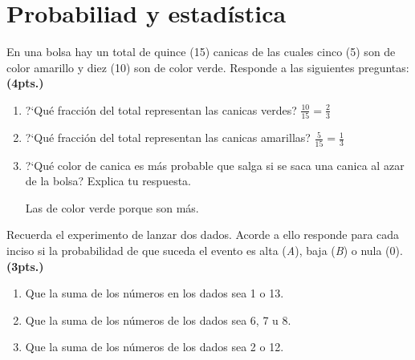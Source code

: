 \documentclass[11pt]{article}
\begin{document}
\vspace{5mm}

\begin{centering}


\end{centering}

\section{Probabiliad y estad\'istica}

En una bolsa hay un total de quince (15) canicas de las cuales cinco (5) son de
color amarillo y diez (10) son de color verde. Responde a las siguientes
preguntas: \hfill  \textbf{(4pts.)}

\begin{enumerate}[label=\alph*)] \itemsep-.3em
\item ?`Qu\'e fracci\'on del total representan las canicas verdes? \qquad $\frac{10}{15} = \frac{2}{3}$ 
\item ?`Qu\'e fracci\'on del total representan las canicas amarillas? \qquad $\frac{5}{15} = \frac{1}{3}$ 
\item ?`Qu\'e color de canica es m\'as probable que salga si se saca una canica
al azar de la bolsa? Explica tu respuesta.

\qquad Las de color verde porque son m\'as.
\end{enumerate}

\vspace{10mm}

Recuerda el experimento de lanzar dos dados. Acorde a ello responde para cada
inciso si la probabilidad de que suceda el evento es alta (\emph{A}), baja
(\emph{B}) o nula (0). \hfill  \textbf{(3pts.)}

\begin{enumerate}[label=\alph*)] \itemsep-.3em
\item Que la suma de los n\'umeros en los dados sea 1 o 13. 
\item Que la suma de los n\'umeros de los dados sea 6, 7 u 8. 
\item Que la suma de los n\'umeros de los dados sea 2 o 12. 
\end{enumerate}
\end{document}
